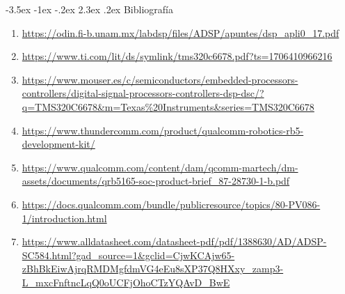 \documentclass[11pt]{report}
\makeatletter
\renewcommand\chapter{\@startsection{chapter}{0}{\z@}%
    {-3.5ex \@plus -1ex \@minus -.2ex}%
    {2.3ex \@plus.2ex}%
    {\normalfont\Large\bfseries}}
\makeatother
\begin{document}
\chapter{Bibliografía} %
\begin{enumerate}
      \item \url{https://odin.fi-b.unam.mx/labdsp/files/ADSP/apuntes/dsp_apli0_17.pdf}
      \item \url{https://www.ti.com/lit/ds/symlink/tms320c6678.pdf?ts=1706410966216}
      \item \url{https://www.mouser.es/c/semiconductors/embedded-processors-controllers/digital-signal-processors-controllers-dsp-dsc/?q=TMS320C6678&m=Texas%20Instruments&series=TMS320C6678}
      \item \url{https://www.thundercomm.com/product/qualcomm-robotics-rb5-development-kit/}
      \item \url{https://www.qualcomm.com/content/dam/qcomm-martech/dm-assets/documents/qrb5165-soc-product-brief_87-28730-1-b.pdf}
      \item \url{https://docs.qualcomm.com/bundle/publicresource/topics/80-PV086-1/introduction.html}
      \item \url{https://www.alldatasheet.com/datasheet-pdf/pdf/1388630/AD/ADSP-SC584.html?gad_source=1&gclid=CjwKCAjw65-zBhBkEiwAjrqRMDMgfdmVG4eEu8sXP37Q8HXxy_zamp3-L_mxcFnftncLqQ0oUCFjOhoCTzYQAvD_BwE}
\end{enumerate}
\end{document}
